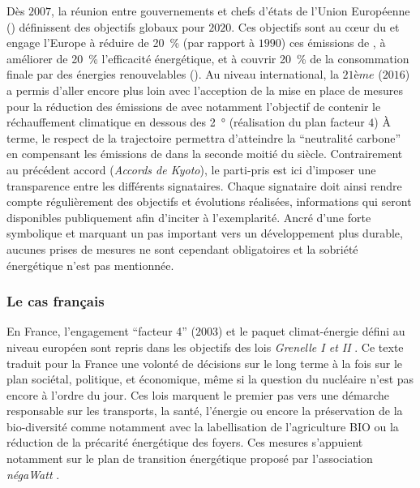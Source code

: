 Dès $2007$, la réunion entre gouvernements et chefs d’états de l’Union Européenne
() définissent des objectifs globaux pour $2020$. Ces objectifs sont au cœur du
 et engage l’Europe à réduire de \SI{20}{\percent} (par rapport à $1990$) ces
émissions de , à améliorer de \SI{20}{\percent} l’efficacité énergétique, et à
couvrir \SI{20}{\percent} de la consommation finale par des énergies renouvelables
(). Au niveau international, la $21ème$  ($2016$) a permis d’aller
encore plus loin avec l’acception de la mise en place de mesures pour la réduction des
émissions de  avec notamment l’objectif de contenir le réchauffement climatique
en dessous des \SI{2}{\degree} (réalisation du plan facteur $4$) À terme, le respect de la trajectoire
permettra d’atteindre la \enquote{neutralité carbone} en compensant les émissions de
 dans la seconde moitié du siècle. Contrairement au précédent accord
(\textit{Accords de Kyoto}), le parti-pris est ici d’imposer une transparence entre les
différents signataires. Chaque signataire doit ainsi rendre compte régulièrement des
objectifs et évolutions réalisées, informations qui seront disponibles publiquement afin
d’inciter à l’exemplarité. Ancré d’une forte symbolique et marquant un pas important vers
un développement plus durable, aucunes prises de mesures ne sont cependant obligatoires et
la sobriété énergétique n’est pas mentionnée.


\subsubsection{Le cas français} %
\label{ssub:le_cas_francais}
En France, l’engagement \enquote{facteur 4} ($2003$) et le paquet climat-énergie défini
au niveau européen sont repris dans les objectifs des lois \textit{Grenelle I et II}
\parencite{Grenelle2010}. Ce texte traduit pour la France une volonté de décisions sur le
long terme à la fois sur le plan sociétal, politique, et économique, même si la question
du nucléaire n’est pas encore à l’ordre du jour. Ces lois marquent le premier pas vers une
démarche responsable sur les transports, la santé, l’énergie ou encore la préservation de
la bio-diversité comme notamment avec la labellisation de l’agriculture BIO ou la
réduction de la précarité énergétique des foyers. Ces mesures s’appuient notamment sur le
plan de transition énergétique proposé par l’association \textit{négaWatt}
\parencite{Salomon2012}.

